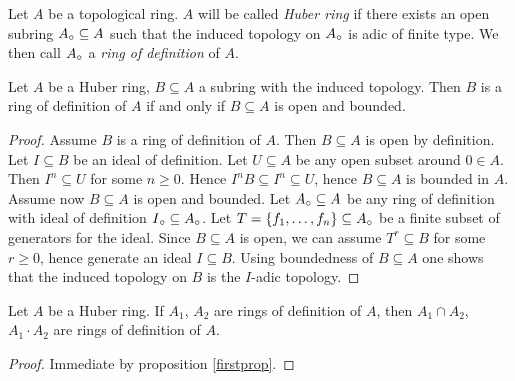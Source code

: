 \begin{definition}
Let $A$ be a topological ring.
$A$ will be  called \emph{Huber ring} if there exists an open subring $A{_{\circ}}\subseteq A$ such that
the induced topology on $A{_{\circ}}$ is adic of finite type.
We then call $A{_{\circ}}$ a \emph{ring of definition} of $A$.
\end{definition}



\begin{prop} \label{firstprop}
Let $A$ be a Huber ring,  $B\subseteq A$ a subring with the induced topology.
Then $B$ is a ring of definition of $A$ if and only if $B\subseteq A$ is open and bounded.
\end{prop}
\begin{proof} 
Assume $B$ is a ring of definition of $A$. Then $B\subseteq A$ is open by definition. Let $I\subseteq B$ be an ideal of definition. Let $U\subseteq A$ be any open subset around $0\in A$.
Then $I^n\subseteq  U$ for some $n\geq0$. Hence $I^nB\subseteq I^n\subseteq U$,
hence $B\subseteq A$ is bounded in $A$.\\
Assume now $B\subseteq A$ is open and bounded. Let $A{_{\circ}}\subseteq A$ be any ring of definition with ideal of definition $I{_{\circ}}\subseteq A{_{\circ}}$.
Let $T=\{f_1,\dots,f_n\}\subseteq A{_{\circ}}$ be a finite subset of generators for the ideal.
Since $B\subseteq A$ is open, we can assume $T^r\subseteq B$ for some $r\geq0$,
hence generate an ideal $I\subseteq B$.
Using boundedness of $B\subseteq A$ one shows that the induced topology on $B$ is the $I$-adic topology.
\end{proof}


\begin{cor}
Let $A$ be a Huber ring. If $A_1$, $A_2$ are rings of definition of $A$, then $A_1\cap A_2$, $A_1\cdot A_2$ are rings of definition of $A$.
\end{cor}
\begin{proof}
Immediate by proposition \ref{firstprop}.
\end{proof}

